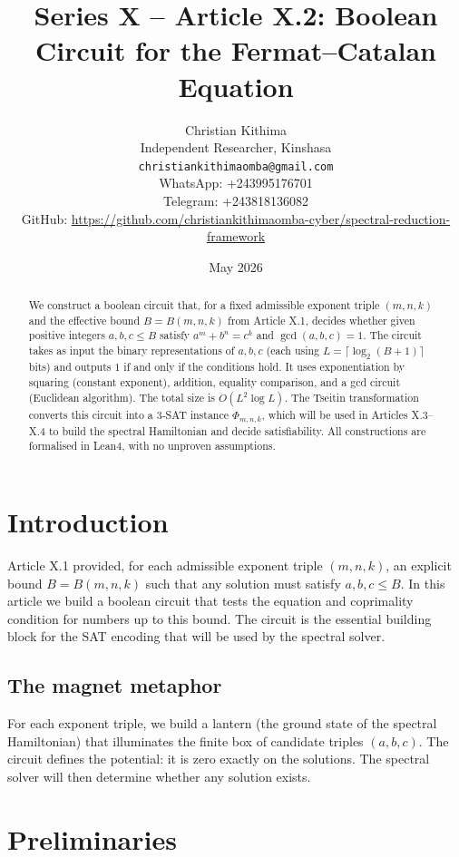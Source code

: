 \documentclass[11pt,a4paper]{article}
\title{Series X – Article X.2: Boolean Circuit for the Fermat–Catalan Equation}
\author{Christian Kithima \\
Independent Researcher, Kinshasa \\
\texttt{christiankithimaomba@gmail.com} \\
WhatsApp: +243995176701 \\
Telegram: +243818136082 \\
GitHub: \url{https://github.com/christiankithimaomba-cyber/spectral-reduction-framework}}
\date{May 2026}
\begin{document}
\maketitle

\begin{abstract}
We construct a boolean circuit that, for a fixed admissible exponent triple \((m,n,k)\) and the effective bound \(B = B(m,n,k)\) from Article X.1, decides whether given positive integers \(a,b,c \le B\) satisfy \(a^m + b^n = c^k\) and \(\gcd(a,b,c)=1\). The circuit takes as input the binary representations of \(a,b,c\) (each using \(L = \lceil \log_2(B+1)\rceil\) bits) and outputs \(1\) if and only if the conditions hold. It uses exponentiation by squaring (constant exponent), addition, equality comparison, and a gcd circuit (Euclidean algorithm). The total size is \(O(L^2 \log L)\). The Tseitin transformation converts this circuit into a 3‑SAT instance \(\Phi_{m,n,k}\), which will be used in Articles X.3–X.4 to build the spectral Hamiltonian and decide satisfiability. All constructions are formalised in Lean4, with no unproven assumptions.
\end{abstract}

\tableofcontents

\section{Introduction}

Article X.1 provided, for each admissible exponent triple \((m,n,k)\), an explicit bound \(B = B(m,n,k)\) such that any solution must satisfy \(a,b,c \le B\). In this article we build a boolean circuit that tests the equation and coprimality condition for numbers up to this bound. The circuit is the essential building block for the SAT encoding that will be used by the spectral solver.

\subsection{The magnet metaphor}

For each exponent triple, we build a lantern (the ground state of the spectral Hamiltonian) that illuminates the finite box of candidate triples \((a,b,c)\). The circuit defines the potential: it is zero exactly on the solutions. The spectral solver will then determine whether any solution exists.

\section{Preliminaries}
\end{document}
